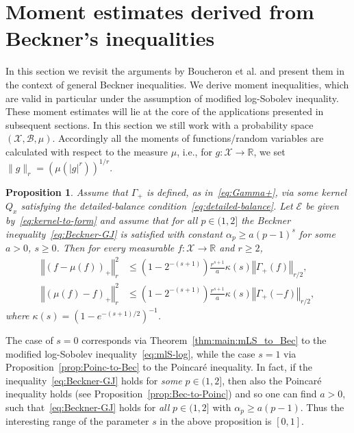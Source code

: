 \documentclass[a4paper]{amsart}
\newtheorem{proposition}[theorem]{Proposition} %
\theoremstyle{definition}
\theoremstyle{remark}
\numberwithin{equation}{section}
\newcommand*{\RR}{\mathbb{R}}
\newcommand{\calX}{\mathcal{X}}
\newcommand{\calB}{\mathcal{B}}
\newcommand*{\calE}{\mathcal{E}}
\newcommand*{\norm}[1]{\left\Vert #1 \right\Vert}
\begin{document}
\section{Moment estimates derived from Beckner's inequalities}

\label{sec:Beckner-Aida-Stroock}
In this section we revisit the arguments by Boucheron et al. \cite[Theorem 15.5]{MR3185193} and present them in the context of general Beckner inequalities. We derive moment inequalities, which are valid in particular under the assumption of modified log-Sobolev inequality. These moment estimates will lie at the core of the applications presented in subsequent sections. In this section we still  work with a probability space $(\calX,\calB,\mu)$. Accordingly all the moments of functions/random variables are calculated with respect to the measure $\mu$, i.e., for $g\colon \calX \to \RR$, we set
$\|g\|_r = (\mu(|g|^r))^{1/r}$.

\begin{proposition}
\label{prop:V^2}
 Assume that $\Gamma_+$ is defined, as in~\eqref{eq:Gamma+}, via some kernel $Q_x$ satisfying the detailed-balance condition~\eqref{eq:detailed-balance}.
 Let $\calE$ be given by~\eqref{eq:kernel-to-form} and assume that for all $p \in (1,2]$ the Beckner inequality~\eqref{eq:Beckner-GJ} is satisfied with constant $\alpha_p \ge a(p-1)^s$ for some $a> 0$, $s\ge0$.
 Then for every measurable $f \colon \calX \to \RR$ and $r\ge 2$,
	\begin{align}
		\norm{(f-\mu(f))_+}_r^2 &\le (1-2^{-(s+1)})\frac{r^{s+1}}{a}\kappa(s) \norm{\Gamma_+(f)}_{r/2},\label{eq:moments-1}\\
		\norm{(\mu(f)-f)_+}_r^2 &\le (1-2^{-(s+1)})\frac{r^{s+1}}{a}\kappa(s) \norm{\Gamma_+(-f)}_{r/2}\label{eq:moments-2},
	\end{align}
	where $\kappa(s)= (1-e^{-(s+1)/2})^{-1}$.
\end{proposition}


The case of $s=0$ corresponds via Theorem~\ref{thm:main:mLS_to_Bec} to the modified log-Sobolev inequality~\eqref{eq:mlS-log}, while the case $s=1$ via Proposition~\ref{prop:Poinc-to-Bec} to the Poincar\'e inequality. In fact, if the inequality~\eqref{eq:Beckner-GJ} holds for \emph{some} $p\in (1,2]$, then also the Poincar\'e inequality holds (see Proposition~\ref{prop:Bec-to-Poinc}) and so one can find $a>0$, such that~\eqref{eq:Beckner-GJ} holds for \emph{all} $p \in (1,2]$ with $\alpha_p \ge a(p-1)$. Thus the interesting range of the parameter $s$ in the above proposition is $[0,1]$.
\end{document}
